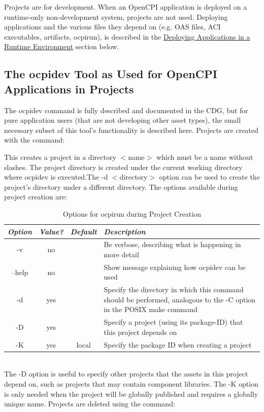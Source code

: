 \documentclass[10pt, a4paper, oneside]{article}
\renewcommand*{\arraystretch}{2.5}%
\renewcommand\_{\textunderscore\allowbreak} %
\begin{document}
Projects are for development.  When an OpenCPI application is deployed on a runtime-only non-development system, projects are not used.  Deploying applications and the various files they depend on (e.g. OAS files, ACI executables, artifacts, ocpirun), is described in the \hyperlink{Developing applications} {Deploying Applications in a Runtime Environment} section below.
\subsection{The ocpidev Tool as Used for OpenCPI Applications in Projects}The ocpidev command is fully described and documented in the CDG, but for pure application users (that are not developing other asset types), the small necessary subset of this tool's functionality is described here.  Projects are created with the command:\begin{ocpixml}
\end{ocpixml}

This creates a project in a directory $<$name$>$ which must be a name without slashes. The project directory is created under the current working directory where ocpidev is executed.The -d $<$directory$>$ option can be used to create the project's directory under a different directory. The options available during project creation are:
\begin{table}[h!]
\caption{Options for ocpirun during Project Creation}
\renewcommand*{\arraystretch}{2.5}
\begin{tabular}[c] {|c|c|c|p{12cm}|}
\hline
\emph{Option} & \emph{Value?} & \emph{Default} & \emph{Description}\\
\hline
-v	&	no	&	{} & Be verbose, describing what is happening in more detail\\
\hline 
--help	& no &	{} & Show message explaining how ocpidev can be used\\
\hline
 -d	&	yes	& {}	& Specify the directory in which this command should be performed, analogous to the -C option in the POSIX make command\\
\hline
 -D	&	yes & {} &	Specify a project (using its package-ID) that this project depends on\\
\hline 
-K &	yes	& local	& Specify the package ID when creating a project\\
\hline
\end{tabular}
\end{table}
\\
The -D option is useful to specify other projects that the assets in this project depend on, such as projects that may contain component libraries.  The -K option is only needed when the project will be globally published and requires a globally unique name. Projects are deleted using the  command:\begin{ocpixml}
{%
\end{ocpixml}
\end{document}
